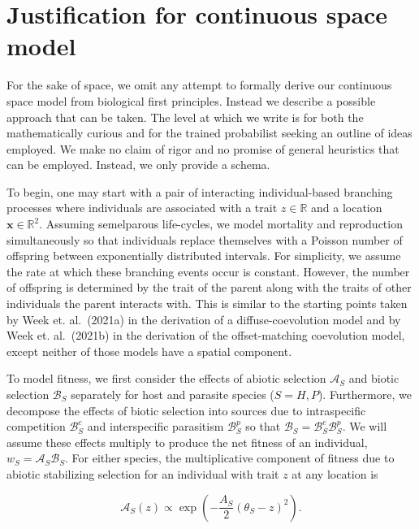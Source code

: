 \documentclass{article}
\begin{document}
\hypertarget{justification-for-continuous-space-model}{%
\section{\texorpdfstring{Justification for continuous space model
\label{just}}{Justification for continuous space model }}\label{justification-for-continuous-space-model}}

For the sake of space, we omit any attempt to formally derive our
continuous space model from biological first principles. Instead we
describe a possible approach that can be taken. The level at which we
write is for both the mathematically curious and for the trained
probabilist seeking an outline of ideas employed. We make no claim of
rigor and no promise of general heuristics that can be employed.
Instead, we only provide a schema.

To begin, one may start with a pair of interacting individual-based
branching processes where individuals are associated with a trait
\(z\in\mathbb R\) and a location \(\pmb x\in\mathbb R^2\). Assuming
semelparous life-cycles, we model mortality and reproduction
simultaneously so that individuals replace themselves with a Poisson
number of offspring between exponentially distributed intervals. For
simplicity, we assume the rate at which these branching events occur is
constant. However, the number of offspring is determined by the trait of
the parent along with the traits of other individuals the parent
interacts with. This is similar to the starting points taken by Week et.
al.~(2021a) in the derivation of a diffuse-coevolution model and by Week
et. al.~(2021b) in the derivation of the offset-matching coevolution
model, except neither of those models have a spatial component.

To model fitness, we first consider the effects of abiotic selection
\(\mathcal A_S\) and biotic selection \(\mathcal B_S\) separately for
host and parasite species (\(S=H,P\)). Furthermore, we decompose the
effects of biotic selection into sources due to intraspecific
competition \(\mathcal B_S^c\) and interspecific parasitism
\(\mathcal B_S^p\) so that
\(\mathcal B_S=\mathcal B_S^c\mathcal B_S^p\). We will assume these
effects multiply to produce the net fitness of an individual,
\(w_S=\mathcal A_S\mathcal B_S\). For either species, the multiplicative
component of fitness due to abiotic stabilizing selection for an
individual with trait \(z\) at any location is

\[\mathcal A_S(z)\propto\exp\left(-\frac{A_S}{2}(\theta_S-z)^2\right).\]
\end{document}

